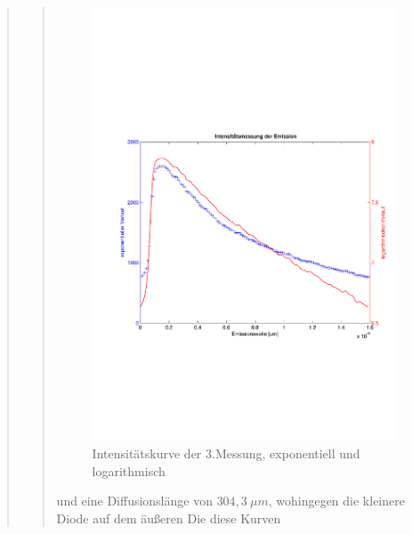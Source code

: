 \begin{quote}
\begin{quote}
        \begin{figure}[H]
                    \centering
                        \includegraphics[scale=0.53, trim = 1cm 6cm 1.5cm 8cm,
                        clip]{./Emissionsbilder/drei/Intensitatsmessung.pdf}
                        \caption{Intensitätskurve der 3.Messung, exponentiell
                        und logarithmisch}
                            \label{fig:./Emissionsbilder/drei/Intensitatsmessung.pdf}
        \end{figure}
        
        und eine Diffusionslänge von $304,3\ \mu m$, wohingegen die kleinere
        Diode auf dem äußeren Die diese Kurven
        

\end{quote}
\end{quote}
